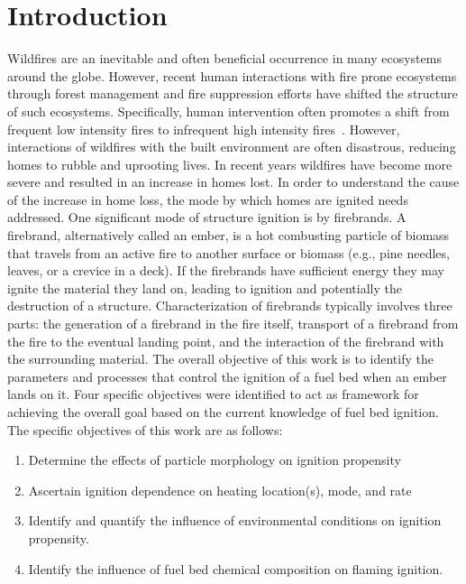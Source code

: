
\chapter{Introduction}
\label{part:intro}
    Wildfires are an inevitable and often beneficial occurrence in many ecosystems around the globe. However, recent human interactions with fire prone ecosystems through forest management and fire suppression efforts have shifted the structure of such ecosystems. Specifically, human intervention often promotes a shift from frequent low intensity fires to infrequent high intensity fires~\cite{Keeley2019}. 
    However, interactions of wildfires with the built environment are often disastrous, reducing homes to rubble and uprooting lives. In recent years wildfires have become more severe and resulted in an increase in homes lost. In order to understand the cause of the increase in home loss, the mode by which homes are ignited needs addressed. One significant mode of structure ignition is by firebrands. A firebrand, alternatively called an ember, is a hot combusting particle of biomass that travels from an active fire to another surface or biomass (e.g., pine needles, leaves, or a crevice in a deck). If the firebrands have sufficient energy they  may ignite the material they land on, leading to ignition and potentially the destruction of a structure. Characterization of firebrands typically involves three parts: the generation of a firebrand in the fire itself, transport of a firebrand from the fire to the eventual landing point, and the interaction of the firebrand with the surrounding material. The overall objective of this work is to identify the parameters and processes that control the ignition of a fuel bed when an ember lands on it. Four specific objectives were identified to act as framework for achieving the overall goal based on the current knowledge of fuel bed ignition. The specific objectives of this work are as follows:
        \begin{enumerate}
            \item Determine the effects of particle morphology on ignition propensity
            \item Ascertain ignition dependence on heating location(s), mode, and rate
            \item Identify and quantify the influence of environmental conditions on ignition propensity.
            \item Identify the influence of fuel bed chemical composition on flaming ignition.
        \end{enumerate}
